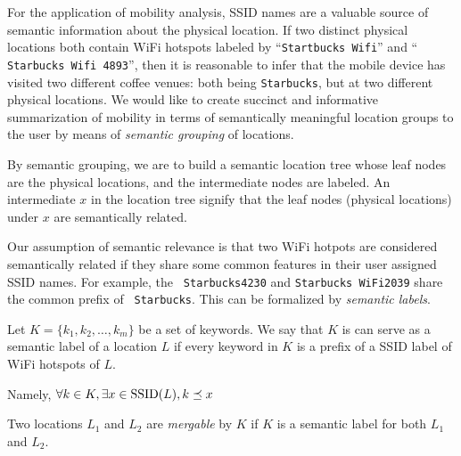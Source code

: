 For the application of mobility analysis, SSID names are a valuable source of
semantic information about the physical location.  If two distinct physical
locations
both contain WiFi hotspots labeled by ``{\tt Startbucks Wifi}'' and ``{\tt
Starbucks Wifi 4893}'', then it is reasonable to infer that the mobile device
has visited two different coffee venues: both being {\tt Starbucks}, but at two
different physical locations.  
We would like to create succinct and informative
summarization of mobility in terms of semantically meaningful location groups to
the user by means of {\em semantic grouping} of locations.

By semantic grouping, we are to build a semantic location tree whose leaf nodes are the physical
locations, and the intermediate nodes are labeled.  An intermediate $x$ in the
location tree signify that the leaf nodes (physical locations) under $x$ are
semantically related.

Our assumption of semantic relevance is that
two WiFi hotpots are considered semantically related if they share some common
features in their user assigned SSID names.  For example, the {\tt
Starbucks4230} and {\tt Starbucks WiFi2039} share the common prefix of {\tt
Starbucks}.  This can be formalized by {\em semantic labels}.

\begin{definition}
    Let $K = \{k_1, k_2, \dots, k_m\}$ be a set of keywords.
    We say that $K$ is can serve as a semantic label of a location $L$ if every
    keyword in $K$ is a prefix of a SSID label of WiFi hotspots of $L$.

    Namely,
    $ \forall k\in K, \exists x\in\mathrm{SSID}(L), k\preceq x$

    Two locations $L_1$ and $L_2$ are {\em mergable} by $K$ if $K$ is a semantic
    label for both $L_1$ and $L_2$.
\end{definition}

